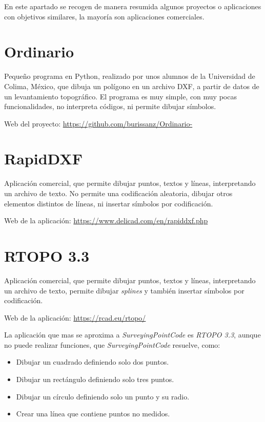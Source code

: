 
En este apartado se recogen de manera resumida algunos proyectos o aplicaciones con objetivos similares, la mayoría son aplicaciones comerciales.

\section{Ordinario}

Pequeño programa en Python, realizado por unos alumnos de la Universidad de Colima, México, que dibuja un polígono en un archivo DXF, a partir de datos de un levantamiento topográfico. El programa es muy simple, con muy pocas funcionalidades, no interpreta códigos, ni permite dibujar símbolos. 

Web del proyecto: \url{https://github.com/burissanz/Ordinario-}


\section{RapidDXF}

Aplicación comercial, que permite dibujar puntos, textos y líneas, interpretando un archivo de texto. No permite una codificación aleatoria, dibujar otros elementos distintos de líneas, ni insertar símbolos por codificación.

Web de la aplicación: \url{https://www.delicad.com/en/rapiddxf.php}


\section{RTOPO 3.3}
Aplicación comercial, que permite dibujar puntos, textos y líneas, interpretando un archivo de texto, permite dibujar \emph{splines} y también insertar símbolos por codificación.

Web de la aplicación: \url{https://rcad.eu/rtopo/}

La aplicación que mas se aproxima a \emph{SurveyingPointCode} es \emph{RTOPO 3.3}, aunque no puede realizar funciones, que \emph{SurveyingPointCode} resuelve, como:
\begin{itemize}
\item Dibujar un cuadrado definiendo solo dos puntos.
\item Dibujar un rectángulo definiendo solo tres puntos.
\item Dibujar un círculo definiendo solo un punto y su radio.
\item Crear una línea que contiene puntos no medidos.
\end{itemize}


